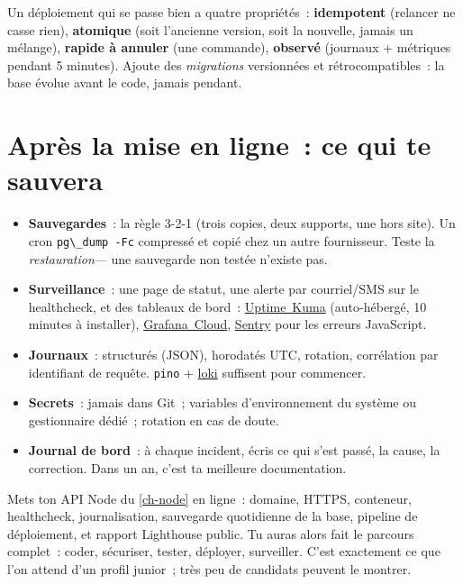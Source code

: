 \documentclass[12pt,a4paper,twoside,openright]{book}
\newcommand{\link}[2]{\href{#2}{#1}}
\begin{document}
Un d\'eploiement qui se passe bien a quatre propri\'et\'es~: \textbf{idempotent} (relancer ne casse rien),
\textbf{atomique} (soit l'ancienne version, soit la nouvelle, jamais un m\'elange),
\textbf{rapide \`a annuler} (une commande), \textbf{observ\'e} (journaux + m\'etriques pendant 5 minutes).
Ajoute des \emph{migrations} versionn\'ees et r\'etrocompatibles~: la base \'evolue avant le code, jamais
pendant.

\section{Apr\`es la mise en ligne~: ce qui te sauvera}

\begin{itemize}
  \item \textbf{Sauvegardes}~: la r\`egle 3-2-1 (trois copies, deux supports, une hors site).
        Un cron \verb|pg\_dump -Fc| compress\'e et copi\'e chez un autre fournisseur. Teste la
        \emph{restauration}--- une sauvegarde non test\'ee n'existe pas.
  \item \textbf{Surveillance}~: une page de statut, une alerte par courriel/SMS sur le healthcheck,
        et des tableaux de bord~: \link{Uptime~Kuma}{https://github.com/louislam/uptime-kuma}
        (auto-h\'eberg\'e, 10 minutes \`a installer), \link{Grafana~Cloud}{https://grafana.com/products/cloud/},
        \link{Sentry}{https://sentry.io/} pour les erreurs JavaScript.
  \item \textbf{Journaux}~: structur\'es (JSON), horodat\'es UTC, rotation, corr\'elation par identifiant
        de requ\^ete. \verb|pino| + \link{loki}{https://grafana.com/oss/loki/} suffisent pour commencer.
  \item \textbf{Secrets}~: jamais dans Git~; variables d'environnement du syst\`eme ou
        gestionnaire d\'edi\'e~; rotation en cas de doute.
  \item \textbf{Journal de bord}~: \`a chaque incident, \'ecris ce qui s'est pass\'e, la cause, la
        correction. Dans un an, c'est ta meilleure documentation.
\end{itemize}

\begin{projet}
Mets ton API Node du \cref{ch-node} en ligne~: domaine, HTTPS, conteneur, healthcheck,
journalisation, sauvegarde quotidienne de la base, pipeline de d\'eploiement, et rapport
Lighthouse public. Tu auras alors fait le parcours complet~: coder, s\'ecuriser, tester, d\'eployer,
surveiller. C'est exactement ce que l'on attend d'un profil junior~; tr\`es peu de candidats
peuvent le montrer.
\end{projet}
\end{document}
